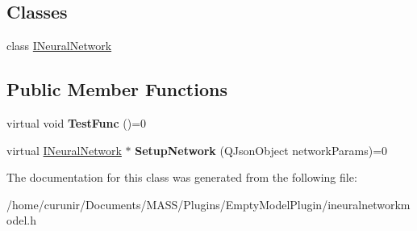 \subsection*{Classes}
\begin{DoxyCompactItemize}
\item 
class \hyperlink{class_i_neural_network_model_1_1_i_neural_network}{I\+Neural\+Network}
\end{DoxyCompactItemize}
\subsection*{Public Member Functions}
\begin{DoxyCompactItemize}
\item 
virtual void {\bfseries Test\+Func} ()=0\hypertarget{class_i_neural_network_model_ac81fd0c1ff87a9147351f1d384a1692e}{}\label{class_i_neural_network_model_ac81fd0c1ff87a9147351f1d384a1692e}

\item 
virtual \hyperlink{class_i_neural_network_model_1_1_i_neural_network}{I\+Neural\+Network} $\ast$ {\bfseries Setup\+Network} (Q\+Json\+Object network\+Params)=0\hypertarget{class_i_neural_network_model_a4732c112899b5f3a4d81db89c7d389a4}{}\label{class_i_neural_network_model_a4732c112899b5f3a4d81db89c7d389a4}

\end{DoxyCompactItemize}


The documentation for this class was generated from the following file\+:\begin{DoxyCompactItemize}
\item 
/home/curunir/\+Documents/\+M\+A\+S\+S/\+Plugins/\+Empty\+Model\+Plugin/ineuralnetworkmodel.\+h\end{DoxyCompactItemize}

